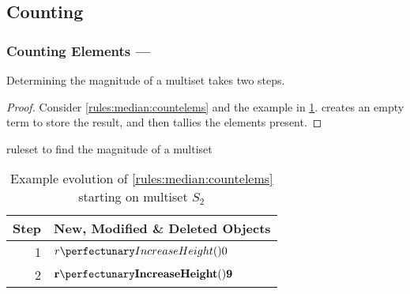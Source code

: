 
\subsection{Counting}\label{sec:median:counting}

\subsubsection{Counting Elements --- }\label{sec:median:countelems}

\begin{proposition}\label{prop:median:countelems}
Determining the magnitude of a multiset takes two steps.
\end{proposition}

\begin{proof}
Consider \cref{rules:median:countelems} and the example in \cref{tab:median:countelems}.   creates an empty term to store the result, and then  tallies the elements present.
\end{proof}

\begin{cprulesetfloat} \begin{cpruleset}



\end{cpruleset}
\caption{\label{rules:median:countelems}\Gls{ruleset} to find the magnitude of a multiset}
\end{cprulesetfloat}

\begin{table}[htbp]
\centering
   \begin{tabular}{|r|l|}
    \hline
    \textbf{Step} & \textbf{New, Modified \& Deleted Objects} \\ \hline
    1 & \(\cpfunc{r}{0}\)\\ \hline
    
    2 & \(\mathbf{\cpfunc{r}{9}}\)\\ \hline
\end{tabular}
\caption[Example evolution of \cref{rules:median:countelems}]{\label{tab:median:countelems}Example evolution of \cref{rules:median:countelems} starting on multiset \(S_2\)}
\end{table}

